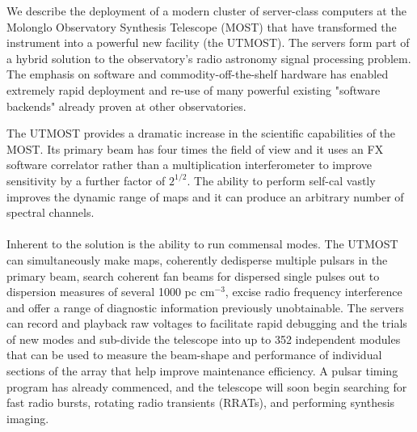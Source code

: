 We describe the deployment of a modern cluster of server-class computers at the Molonglo Observatory Synthesis Telescope (MOST) that have transformed the instrument into a powerful new facility (the UTMOST). The servers form part of a hybrid solution to the observatory's radio astronomy signal processing problem. The emphasis on software and commodity-off-the-shelf hardware has enabled extremely rapid deployment and re-use of many powerful existing "software backends" already proven at other observatories. 

The UTMOST provides a dramatic increase in the scientific capabilities of the MOST. Its primary beam has four times the field of view and it uses an FX software correlator rather than a multiplication interferometer to improve sensitivity by a further factor of $2^{1/2}$. The ability to perform self-cal vastly improves the dynamic range of maps and it can produce an arbitrary number of spectral channels.\\\\ Inherent to the solution is the ability to run commensal modes. The UTMOST can simultaneously make maps, coherently dedisperse multiple pulsars in the primary beam, search coherent fan beams for dispersed single pulses out to dispersion measures of several 1000 pc cm$^{-3}$, excise radio frequency interference and offer a range of diagnostic information previously unobtainable. The servers can record and playback raw voltages to facilitate rapid debugging and the trials of new modes and sub-divide the telescope into up to 352 independent modules that can be used to measure the beam-shape and performance of individual sections of the array that help improve maintenance efficiency. A pulsar timing program has already commenced, and the telescope will soon begin searching for fast radio bursts, rotating radio transients (RRATs), and performing synthesis imaging. 
